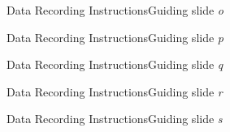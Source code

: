 \begin{frame}{Data Recording Instructions}{Guiding slide \textit{o}}
    \begin{center}
    \end{center}
\end{frame}

\begin{frame}{Data Recording Instructions}{Guiding slide \textit{p}}
    \begin{center}
    \end{center}
\end{frame}

\begin{frame}{Data Recording Instructions}{Guiding slide \textit{q}}
    \begin{center}
    \end{center}
\end{frame}

\begin{frame}{Data Recording Instructions}{Guiding slide \textit{r}}
    \begin{center}
    \end{center}
\end{frame}

\begin{frame}{Data Recording Instructions}{Guiding slide \textit{s}}
    \begin{center}
    \end{center}
\end{frame}
